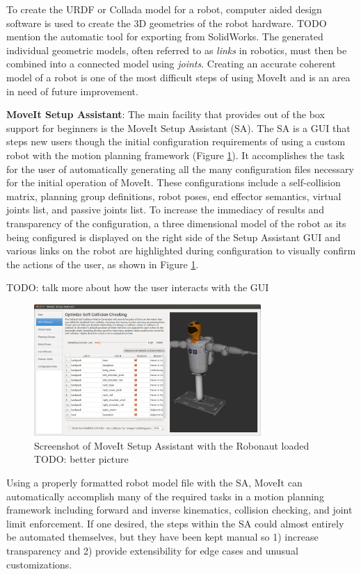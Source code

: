 \documentclass[10pt,journal,compsoc]{joser1}
\begin{document}
{To create the URDF or Collada model for a robot, computer aided design software is used to create the 3D geometries of the robot hardware. TODO mention the automatic tool for exporting from SolidWorks. The generated individual geometric models, often referred to as \textit{links} in robotics, must then be combined into a connected model using \textit{joints}. Creating an accurate coherent model of a robot is one of the most difficult steps of using MoveIt and is an area in need of future improvement.

{\bf MoveIt Setup Assistant}: The main facility that provides out of the box support for beginners is the MoveIt Setup Assistant (SA). The SA is a GUI that steps new users though the initial configuration requirements of using a custom robot with the motion planning framework (Figure \ref{fig:setupassistant}). It accomplishes the task for the user of automatically generating all the many configuration files necessary for the initial operation of MoveIt. These configurations include a self-collision matrix, planning group definitions, robot poses, end effector semantics, virtual joints list, and passive joints list. To increase the immediacy of results and transparency of the configuration, a three dimensional model of the robot as its being configured is displayed on the right side of the Setup Assistant GUI and various links on the robot are highlighted during configuration to visually confirm the actions of the user, as shown in Figure \ref{fig:setupassistant}.

TODO: talk more about how the user interacts with the GUI

\begin{figure}[!t]
\centering
\includegraphics[width=3.4in]{images/setup_assistant}
\caption{Screenshot of MoveIt Setup Assistant with the Robonaut loaded TODO: better picture}
\label{fig:setupassistant}
\end{figure}

Using a properly formatted robot model file with the SA, MoveIt can automatically accomplish many of the required tasks in a motion planning framework including forward and inverse kinematics, collision checking, and joint limit enforcement. If one desired, the steps within the SA could almost entirely be automated themselves, but they have been kept manual so 1) increase transparency and 2) provide extensibility for edge cases and unusual customizations.

}
\end{document}
